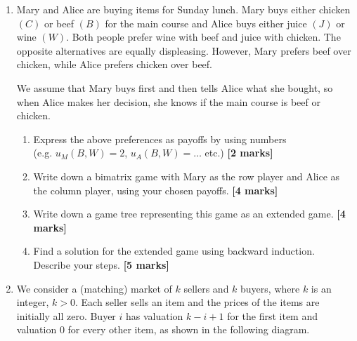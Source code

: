 \documentclass{article}
\begin{document}
\begin{enumerate}
	      \newpage




	\item[\textbf{Exercise 3.}]   %

	      Mary and Alice are buying items for Sunday lunch. Mary buys either chicken $(C)$ or beef $(B)$ for the main course and Alice buys either juice $(J)$
	      or wine $(W)$. Both people prefer wine with beef and juice with chicken. The opposite alternatives are equally displeasing.
	      However, Mary prefers beef over chicken, while Alice prefers chicken over beef.

	      We assume that Mary buys first and then tells Alice what she bought,
	      so when Alice makes her decision, she knows if the main course is beef or chicken.

	      \begin{enumerate}
		      \item[(a)] Express the above preferences as payoffs by using numbers\\(e.g.
		            $u_M(B,W) = 2$, $u_A(B,W) = \ldots$  etc.)               \hfill{\bf [2 marks]}\smallskip
		      \item[(b)] Write down a bimatrix game with Mary as the row player
		            and Alice as the column player, using your chosen payoffs.           \hfill{\bf [4 marks]}\smallskip
		      \item[(c)] Write down a game tree representing this game as an extended game.  \hfill{\bf [4 marks]}\smallskip
		      \item[(d)] Find a solution for the extended game using backward induction.\\Describe your steps.  \hfill{\bf [5 marks]}\smallskip
	      \end{enumerate}
	      \vspace*{0.8cm}



	\item[\textbf{Exercise 4.}]  %

	      We consider a (matching) market of $k$ sellers and $k$ buyers, where $k$ is an integer, $k>0$.
	      Each seller sells an item and the prices of the items are initially all zero. Buyer $i$ has valuation $k-i+1$ for the first item and valuation $0$ for every other item, as shown in the following diagram.


\end{enumerate}
\end{document}
